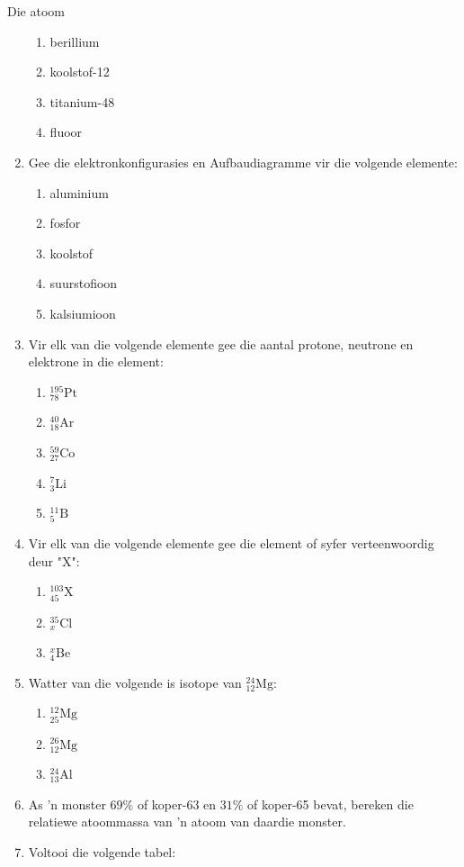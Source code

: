 \begin{eocexercises}{Die atoom}
\begin{enumerate}[noitemsep, label=\textbf{\arabic*}. ]
\begin{enumerate}[noitemsep, label=\textbf{\alph*}. ]
            \item berillium
\item koolstof-12
\item titanium-48
\item fluoor
\end{enumerate}
\item Gee die elektronkonfigurasies en Aufbaudiagramme vir die volgende elemente:
\label{m38741*id7624}\begin{enumerate}[noitemsep, label=\textbf{\alph*}. ] 
            \item aluminium
\item fosfor
\item koolstof
\item suurstofioon
\item kalsiumioon
\end{enumerate}
\item Vir elk van die volgende elemente gee die aantal protone, neutrone en elektrone in die element: 
\begin{enumerate}[noitemsep, label=\textbf{\alph*}. ] 
\item $_{78}^{195}\text{Pt}$
\item $_{18}^{40}\text{Ar}$
\item $_{27}^{59}\text{Co}$
\item $_{3}^{7}\text{Li}$
\item $_{5}^{11}\text{B}$
\end{enumerate}
\item Vir elk van die volgende elemente gee die element of syfer verteenwoordig deur "X": \label{m38741*id7434324}\begin{enumerate}[noitemsep, label=\textbf{\alph*}. ] 
            \item $_{45}^{103}\text{X}$
\item $_{x}^{35}\text{Cl}$
\item $_{4}^{x}\text{Be}$
\end{enumerate}
\item Watter van die volgende is isotope van $_{12}^{24}\text{Mg}$: \label{m38741*id743234}
\begin{enumerate}[noitemsep, label=\textbf{\alph*}. ] 
            \item $_{25}^{12}\text{Mg}$
\item $_{12}^{26}\text{Mg}$
\item $_{13}^{24}\text{Al}$
\end{enumerate}
\item As 'n monster $69\%$ of koper-63 en $31\%$ of koper-65 bevat, bereken die relatiewe atoommassa van 'n atoom van daardie monster.
            \item Voltooi die volgende tabel:
          \begin{table}[H]
        \begin{center}
      

\end{center}
\end{table}
\end{enumerate}
\end{eocexercises}
